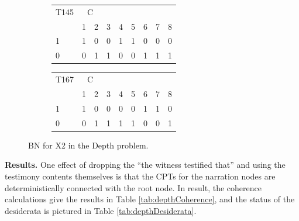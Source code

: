 \documentclass[
  10pt,
]{scrartcl}
\begin{document}
\begin{figure}[H]
{\begin{subfigure}[!ht]{0.3\textwidth}
\begin{tabular}{lrrrrrrrr}
\toprule
\multicolumn{1}{c}{T145} & \multicolumn{2}{c}{C} \\
  & 1 & 2 & 3 & 4 & 5 & 6 & 7 & 8\\
\midrule
1 & 1 & 0 & 0 & 1 & 1 & 0 & 0 & 0\\
0 & 0 & 1 & 1 & 0 & 0 & 1 & 1 & 1\\
\bottomrule
\end{tabular}


\begin{tabular}{lrrrrrrrr}
\toprule
\multicolumn{1}{c}{T167} & \multicolumn{2}{c}{C} \\
  & 1 & 2 & 3 & 4 & 5 & 6 & 7 & 8\\
\midrule
1 & 1 & 0 & 0 & 0 & 0 & 1 & 1 & 0\\
0 & 0 & 1 & 1 & 1 & 1 & 0 & 0 & 1\\
\bottomrule
\end{tabular}
\end{subfigure}}
\caption{BN for \textsf{X2} in the \textsf{Depth} problem.}
\label{fig:dod2}
\end{figure}

\textbf{Results.} One effect of dropping the ``the witness testified that'' and using the testimony contents themselves is that the CPTs for the narration nodes are deterministically connected with the root node. In result, the coherence calculations give the results in Table \ref{tab:depthCoherence}, and the status of the desiderata is pictured in Table \ref{tab:depthDesiderata}.

\begin{table}[H]

\caption{\label{tab:depthCoherence}Coherence scores for the Depth problem (rounded).}
\centering
{}
\end{table}
\end{document}
